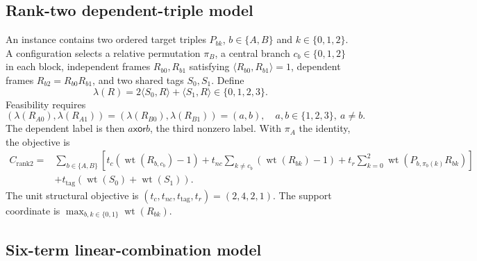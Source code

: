 \documentclass[a4paper,onecolumn,11pt,unpublished,noarxiv]{quantumarticle}
\begin{document}
\subsection{Rank-two dependent-triple model}

An instance contains two ordered target triples $P_{bk}$, $b\in\{A,B\}$ and $k\in\{0,1,2\}$.  A configuration selects a relative permutation $\pi_B$, a central branch $c_b\in\{0,1,2\}$ in each block, independent frames $R_{b0},R_{b1}$ satisfying $\langle R_{b0},R_{b1}\rangle=1$, dependent frames $R_{b2}=R_{b0}R_{b1}$, and two shared tags $S_0,S_1$.  Define
\begin{equation}
\lambda(R)=2\langle S_0,R\rangle+\langle S_1,R\rangle\in\{0,1,2,3\}.
\end{equation}
Feasibility requires
\begin{equation}
(\lambda(R_{A0}),\lambda(R_{A1}))=(\lambda(R_{B0}),\lambda(R_{B1}))=(a,b),
\quad a,b\in\{1,2,3\},\ a\ne b.
\label{eq:rank2-labels}
\end{equation}
The dependent label is then $a\mathbin{\mathsf{xor}}b$, the third nonzero label.  With $\pi_A$ the identity, the objective is
\begin{align}
C_{\mathrm{rank2}}={}&\sum_{b\in\{A,B\}}\left[t_c(\operatorname{wt}(R_{b,c_b})-1)+t_{nc}\sum_{k\ne c_b}(\operatorname{wt}(R_{bk})-1)+t_r\sum_{k=0}^2\operatorname{wt}(P_{b,\pi_b(k)}R_{bk})\right]\nonumber\\
&+t_{\mathrm{tag}}\left(\operatorname{wt}(S_0)+\operatorname{wt}(S_1)\right).
\label{eq:rank2-cost}
\end{align}
The unit structural objective is $(t_c,t_{nc},t_{\mathrm{tag}},t_r)=(2,4,2,1)$.  The support coordinate is $\max_{b,k\in\{0,1\}}\operatorname{wt}(R_{bk})$.

\subsection{Six-term linear-combination model}
\end{document}
